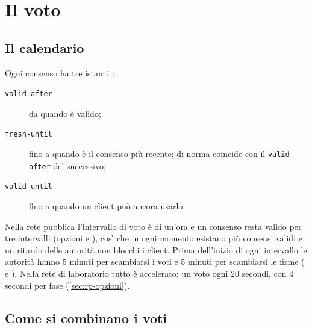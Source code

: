 \section{Il voto}\label{sec:dir-voto}

\subsection{Il calendario}

Ogni consenso ha tre istanti~:
\begin{description}
  \item[\texttt{valid-after}] da quando è valido;
  \item[\texttt{fresh-until}] fino a quando è il consenso più recente; di norma coincide con il \texttt{valid-after} del successivo;
  \item[\texttt{valid-until}] fino a quando un client può ancora usarlo.
\end{description}
Nella rete pubblica l'intervallo di voto è di un'ora e un consenso resta valido per tre intervalli (opzioni  e ), così che in ogni momento esistano più consensi validi e un ritardo delle autorità non blocchi i client. Prima dell'inizio di ogni intervallo le autorità hanno 5 minuti per scambiarsi i voti e 5 minuti per scambiarsi le firme ( e ). Nella rete di laboratorio tutto è accelerato: un voto ogni 20 secondi, con 4 secondi per fase (\cref{sec:rp-opzioni}).

\subsection{Come si combinano i voti}

